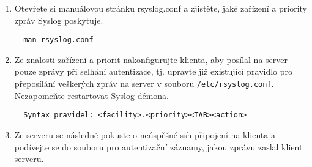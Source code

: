 \begin{itemize}
\begin{enumerate}
            \item Otevřete si manuálovou stránku rsyslog.conf a zjistěte, jaké zařízení a priority
         zpráv Syslog poskytuje. 
\begin{verbatim} 
  man rsyslog.conf
\end{verbatim} 
        
         \item Ze znalosti zařízení a priorit nakonfigurujte klienta, aby posílal na server 
         pouze zprávy při selhání autentizace, tj. upravte již existující pravidlo pro přeposílání
         veškerých zpráv na server v souboru {\tt /etc/rsyslog.conf}. Nezapomeňte restartovat Syslog démona. 
         
\begin{verbatim} 
  Syntax pravidel: <facility>.<priority><TAB><action>
\end{verbatim} 
         \item Ze serveru se následně pokuste o neúspěšné ssh připojení na klienta a podívejte se
         do souboru pro autentizační záznamy, jakou zprávu zaslal klient serveru.


       \end{enumerate}
   \end{itemize}

